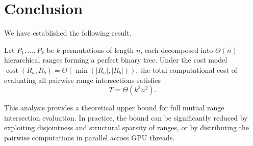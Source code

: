 \documentclass[11pt]{article}
\begin{document}
\section{Conclusion}

We have established the following result.

\begin{theorem}
Let $P_1, \dots, P_k$ be $k$ permutations of length $n$, each decomposed into $\Theta(n)$ hierarchical ranges forming a perfect binary tree.  
Under the cost model $\operatorname{cost}(R_a, R_b) = \Theta(\min(|R_a|, |R_b|))$, the total computational cost of evaluating all pairwise range intersections satisfies
\[
T = \Theta(k^2 n^2).
\]
\end{theorem}

This analysis provides a theoretical upper bound for full mutual range intersection evaluation.  
In practice, the bound can be significantly reduced by exploiting disjointness and structural sparsity of ranges, or by distributing the pairwise computations in parallel across GPU threads.
\end{document}
